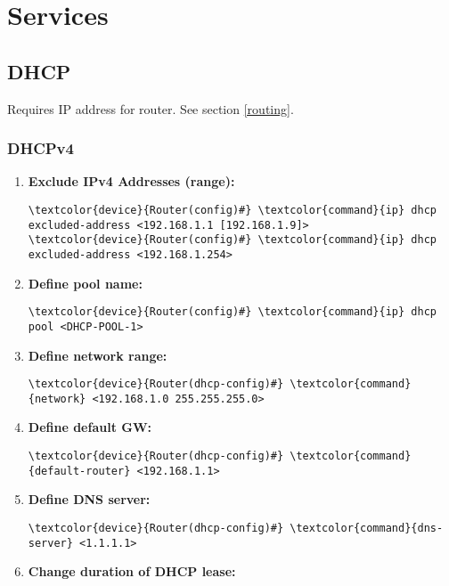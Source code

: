 \documentclass[10pt, a4paper, onecolumn, oneside, titlepage, openany]{book}
\begin{document}
\chapter{Services}
\section{DHCP}
Requires IP address for router. See section \ref{routing}.
\subsection{DHCPv4}
\begin{enumerate}
    \item \textbf{Exclude IPv4 Addresses (range):}
\begin{Verbatim}[commandchars=\\\{\}]
\textcolor{device}{Router(config)#} \textcolor{command}{ip} dhcp excluded-address <192.168.1.1 [192.168.1.9]>
\textcolor{device}{Router(config)#} \textcolor{command}{ip} dhcp excluded-address <192.168.1.254>
\end{Verbatim}
    \item \textbf{Define pool name:}
\begin{Verbatim}[commandchars=\\\{\}]
\textcolor{device}{Router(config)#} \textcolor{command}{ip} dhcp pool <DHCP-POOL-1>
\end{Verbatim}
    \item \textbf{Define network range:}
\begin{Verbatim}[commandchars=\\\{\}]
\textcolor{device}{Router(dhcp-config)#} \textcolor{command}{network} <192.168.1.0 255.255.255.0>
\end{Verbatim}
    \item \textbf{Define default GW:}
\begin{Verbatim}[commandchars=\\\{\}]
\textcolor{device}{Router(dhcp-config)#} \textcolor{command}{default-router} <192.168.1.1>
\end{Verbatim}
    \item \textbf{Define DNS server:}
\begin{Verbatim}[commandchars=\\\{\}]
\textcolor{device}{Router(dhcp-config)#} \textcolor{command}{dns-server} <1.1.1.1>
\end{Verbatim}
    \item \textbf{Change duration of DHCP lease:}
\begin{Verbatim}[commandchars=\\\{\}]

\end{Verbatim}
\end{enumerate}
\end{document}

